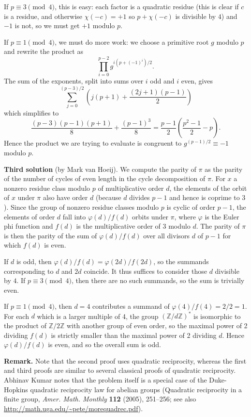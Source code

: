 \documentclass[amssymb,twocolumn,pra,10pt,aps]{revtex4-1}
\newcommand{\ZZ}{\mathbb{Z}}
\begin{document}
\begin{itemize}
If $p \equiv 3 \pmod{4}$, this is easy: each factor is a quadratic residue (this is clear if $c$ is a residue,
and otherwise $\chi(-c) = +1$ so $p+\chi(-c)$ is divisible by $4$) and $-1$ is not, so we must get $+1$
modulo $p$.

If $p \equiv 1 \pmod{4}$, we must do more work: we
choose a primitive root $g$ modulo $p$ and rewrite the product as
\[
\prod_{i=0}^{p-2} g^{i(p+(-1)^i)/2}.
\]
The sum of the exponents, split into sums over $i$ odd and $i$ even, gives
\[
\sum_{j=0}^{(p-3)/2} \left( j(p+1) + \frac{(2j+1)(p-1)}{2}\right)
\]
which simplifies to
\[
\frac{(p-3)(p-1)(p+1)}{8} + \frac{(p-1)^3}{8} = \frac{p-1}{2} \left( \frac{p^2 - 1}{2} - p \right).
\]
Hence the product we are trying to evaluate is congruent to $g^{(p-1)/2} \equiv -1$ modulo $p$.

\noindent
\textbf{Third solution} (by Mark van Hoeij).
We compute the parity of $\pi$ as the parity of the number of cycles of even length
in the cycle decomposition of $\pi$.
For $x$ a nonzero residue class modulo $p$ of multiplicative order $d$, the elements of the orbit of $x$
under $\pi$ also have order $d$ (because $d$ divides $p-1$ and hence is coprime to $3$). Since the group
of nonzero residue classes modulo $p$ is cyclic of order $p-1$, the elements of order $d$ fall into
$\varphi(d)/f(d)$ orbits under $\pi$, where $\varphi$ is the Euler phi function and $f(d)$ is the
multiplicative order of 3 modulo $d$. The parity of $\pi$ is then the parity of the sum of $\varphi(d)/f(d)$
over all divisors $d$ of $p-1$ for which $f(d)$ is even.

If $d$ is odd, then $\varphi(d)/f(d) = \varphi(2d)/f(2d)$, so the summands corresponding to $d$ and $2d$
coincide. It thus suffices to consider those $d$ divisible by $4$. If $p \equiv 3 \pmod{4}$, then there are no
such summands, so the sum is trivially even.

If $p \equiv 1 \pmod{4}$, then $d=4$ contributes a summand of $\varphi(4)/f(4) = 2/2 = 1$.
For each $d$ which is a larger multiple of 4, the group $(\ZZ/d\ZZ)^*$ is isomorphic to the product of
$\ZZ/2\ZZ$ with another group of even order, so the maximal power of 2 dividing $f(d)$ is strictly smaller
than the maximal power of 2 dividing $d$. Hence $\varphi(d)/f(d)$ is even, and so the overall sum is odd.

\noindent
\textbf{Remark.}
Note that the second proof uses quadratic reciprocity, whereas the first and third proofs are similar to several classical
proofs of quadratic reciprocity. Abhinav Kumar notes that the problem itself is a special case
of the Duke-Hopkins quadratic reciprocity law for abelian groups (Quadratic reciprocity in a finite group,
\textit{Amer. Math. Monthly} \textbf{112} (2005), 251--256; see also
\url{http://math.uga.edu/~pete/morequadrec.pdf}).


\end{itemize}
\end{document}
